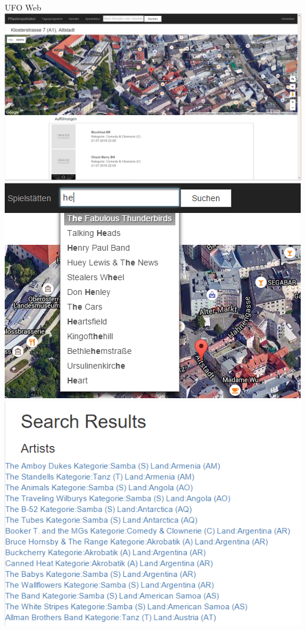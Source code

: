 \begin{section}{UFO Web}
\FloatBarrier
\includegraphics[angle=0, scale=0.40]{./img/3_ausb_page5.PNG}
\FloatBarrier
\includegraphics[angle=0, scale=0.65]{./img/3_ausb_page6.PNG}
\FloatBarrier
\includegraphics[angle=0, scale=0.65]{./img/3_ausb_page7.PNG}
\FloatBarrier

\end{section}